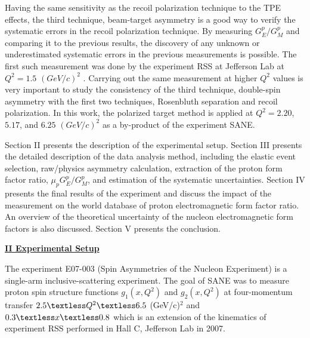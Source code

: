 \documentclass[12pt]{article}
\begin{document}
Having the same sensitivity as the recoil polarization technique to the TPE effects, the third technique,  beam-target asymmetry is a good way to verify the systematic errors in the recoil polarization technique. By measuring $G_E^p/G_M^p$ and comparing it to the previous results, the discovery of any unknown or underestimated systematic errors in the previous measurements is possible. The first such measurement was done by the experiment RSS at Jefferson Lab at $Q^2=1.5$ $(GeV/c)^2$ \cite{60}. Carrying out the same measurement at higher $Q^2$ values is very important to study the consistency of the third technique, double-spin asymmetry with the first two techniques, Rosenbluth separation and recoil polarization. In this work, the polarized target method is applied at $Q^2 = 2.20$, $5.17$, and $6.25$ $(GeV/c)^2$ as a by-product of the experiment SANE.

Section II presents the description of the experimental setup. Section III presents the detailed description of the data analysis method, including the elastic event selection, raw/physics asymmetry calculation, extraction of the proton form factor ratio, $\mu_pG^p_E/G^p_M$, and estimation of the systematic uncertainties. Section IV presents the final results of the experiment and discuss the impact of the measurement on the world database of proton electromagnetic form factor ratio. An overview of the theoretical uncertainty of the nucleon electromagnetic form factors is also discussed. Section V presents the conclusion. 

\vspace{8 mm}

{
\raggedleft
\underline{\textbf{II Experimental Setup}}
}

The experiment E07-003 (Spin Asymmetries of the Nucleon Experiment) is a single-arm inclusive-scattering experiment. The goal of SANE was to measure proton spin structure functions $g_1(x, Q^2)$ and $g_2(x, Q^2)$ at four-momentum transfer $2.5\textless Q^2 \textless 6.5$ (GeV/c)$^2$ and $0.3 \textless x \textless 0.8$ which is an extension of the kinematics of experiment RSS \cite{179} performed in Hall C, Jefferson Lab in 2007. 
 
\end{document}
